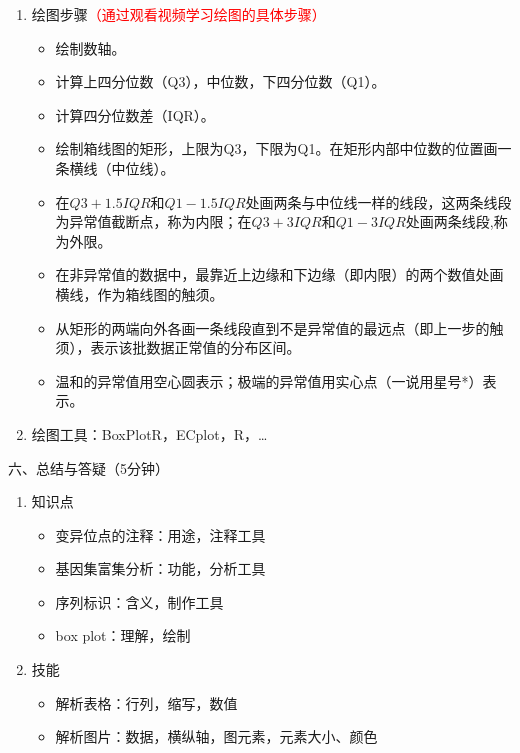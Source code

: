 \documentclass{TIJMUjiaoanLL}
\begin{document}
\begin{enumerate}
  \item 绘图步骤\textcolor{red}{（通过观看视频学习绘图的具体步骤）}
  \begin{itemize}
  \item 绘制数轴。
  \item 计算上四分位数（Q3），中位数，下四分位数（Q1）。
  \item 计算四分位数差（IQR）。
  \item 绘制箱线图的矩形，上限为Q3，下限为Q1。在矩形内部中位数的位置画一条横线（中位线）。
  \item 在$Q3 + 1.5IQR$和$Q1 - 1.5IQR$处画两条与中位线一样的线段，这两条线段为异常值截断点，称为内限；在$Q3 + 3IQR$和$Q1 - 3IQR$处画两条线段,称为外限。
  \item 在非异常值的数据中，最靠近上边缘和下边缘（即内限）的两个数值处画横线，作为箱线图的触须。
  \item 从矩形的两端向外各画一条线段直到不是异常值的最远点（即上一步的触须），表示该批数据正常值的分布区间。
  \item 温和的异常值用空心圆表示；极端的异常值用实心点（一说用星号*）表示。
  \end{itemize}
  \item 绘图工具：BoxPlotR，ECplot，R，\ldots
\end{enumerate}

\vspace*{0.2cm}
\noindent
六、总结与答疑（5分钟）
\begin{enumerate}
  \item 知识点
    \begin{itemize}
      \item 变异位点的注释：用途，注释工具
      \item 基因集富集分析：功能，分析工具
      \item 序列标识：含义，制作工具
      \item box plot：理解，绘制
    \end{itemize}
  \item 技能
    \begin{itemize}
      \item 解析表格：行列，缩写，数值
      \item 解析图片：数据，横纵轴，图元素，元素大小、颜色
    \end{itemize}
\end{enumerate}
 
\otherTail
\end{document}
